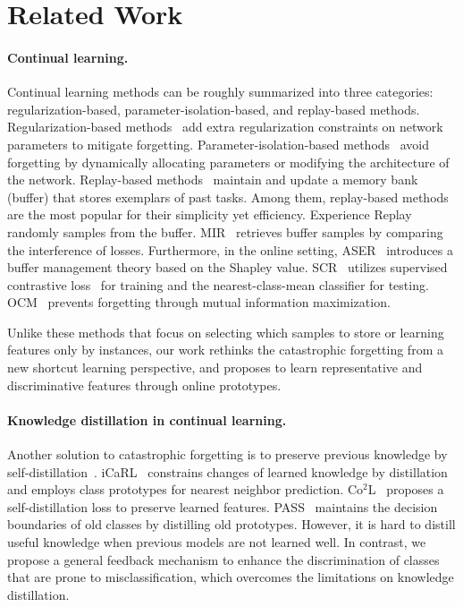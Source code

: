 \section{Related Work}
\paragraph{Continual learning.}
Continual learning methods can be roughly summarized into three categories: regularization-based, parameter-isolation-based, and replay-based methods. Regularization-based methods~\cite{EWC, regular1, regular2, regular3} add extra regularization constraints on network parameters to mitigate forgetting. Parameter-isolation-based methods~\cite{PNN, para-iso1, para-iso2, pathNet} avoid forgetting by dynamically allocating parameters or modifying the architecture of the network. Replay-based methods~\cite{ER, MIR, GSS, AGEM, DER++, GDumb} maintain and update a memory bank (buffer) that stores exemplars of past tasks. 
Among them, replay-based methods are the most popular for their simplicity yet efficiency. Experience Replay~\cite{ER} randomly samples from the buffer. MIR~\cite{MIR} retrieves buffer samples by comparing the interference of losses. Furthermore, in the online setting, ASER~\cite{ASER} introduces a buffer management theory based on the Shapley value. SCR~\cite{SCR} utilizes supervised contrastive loss~\cite{SupCL} for training and the nearest-class-mean classifier for testing. OCM~\cite{OCM} prevents forgetting through mutual information maximization.

Unlike these methods that focus on selecting which samples to store or learning features only by instances, our work rethinks the catastrophic forgetting from a new shortcut learning perspective, and proposes to learn representative and discriminative features through online prototypes.


\paragraph{Knowledge distillation in continual learning.}
Another solution to catastrophic forgetting is to preserve previous knowledge by self-distillation~\cite{iCaRL, DER++, kd1, Co2L, protoAug, OCM}. iCaRL~\cite{iCaRL} constrains changes of learned knowledge by distillation and employs class prototypes for nearest neighbor prediction. Co$^2$L~\cite{Co2L} proposes a self-distillation loss to preserve learned features. PASS~\cite{protoAug} maintains the decision boundaries of old classes by distilling old prototypes.
However, it is hard to distill useful knowledge when previous models are not learned well.
In contrast, we propose a general feedback mechanism to enhance the discrimination of classes that are prone to misclassification, which overcomes the limitations on knowledge distillation.




